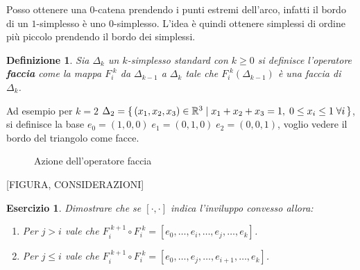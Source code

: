 \documentclass[10pt, twoside=false, x11names]{scrbook}
\newtheorem{definition}[theorem]{Definizione}
\newcounter{exercises}
\newtheorem{exercise}[exercises]{Esercizio}
\newcommand{\RN}[1][]{\mathbb{R}^#1}
\begin{document}
Posso ottenere una $ 0 $-catena prendendo i punti estremi dell'arco, infatti il bordo di un $ 1 $-simplesso
è uno $ 0 $-simplesso. L'idea è quindi ottenere simplessi di ordine più piccolo prendendo il
bordo dei simplessi.

\begin{definition}
  Sia $ \Delta_k $ un $ k $-simplesso standard con $ k \geq 0 $ si definisce l'operatore \textbf{faccia} come
  la mappa $ F_i^{\;k} $ da $ \Delta_{k-1} $ a $ \Delta_k $ tale che $ F_i^{\;k}(\Delta_{k-1}) $ è una faccia di $ \Delta_k $.
\end{definition}

Ad esempio per $ k = 2 $ $ \Delta_2 = \set{ (x_1,x_2,x_3) \in \RN{3} | x_1 + x_2 + x_3 = 1, \; 0 \leq x_i \leq 1 \; \forall i} $,
si definisce la base $ e_0 = (1,0,0) \; e_1 = (0,1,0) \; e_2 = (0,0,1) $, voglio vedere il bordo del triangolo
come facce.

\begin{figure}[htbp]
  \centering
  \caption{Azione dell'operatore faccia}
  \label{fig:lez1:standard_simplex_faces}
\end{figure}

[FIGURA, CONSIDERAZIONI]

\begin{exercise}
  Dimostrare che se $ [\cdot, \cdot] $ indica l'inviluppo convesso allora:
  \begin{enumerate}
  \item Per $ j > i $ vale che $ F_i^{\; k+1} \circ F_i^{\; k} = [e_0, \dots, e_i, \dots, e_j, \dots, e_k ] $.
  \item Per $ j \leq i $ vale che $ F_i^{\; k+1} \circ F_i^{\; k} = [e_0, \dots, e_j, \dots, e_{i+1}, \dots, e_k ] $.
  \end{enumerate}
\end{exercise}
\end{document}

